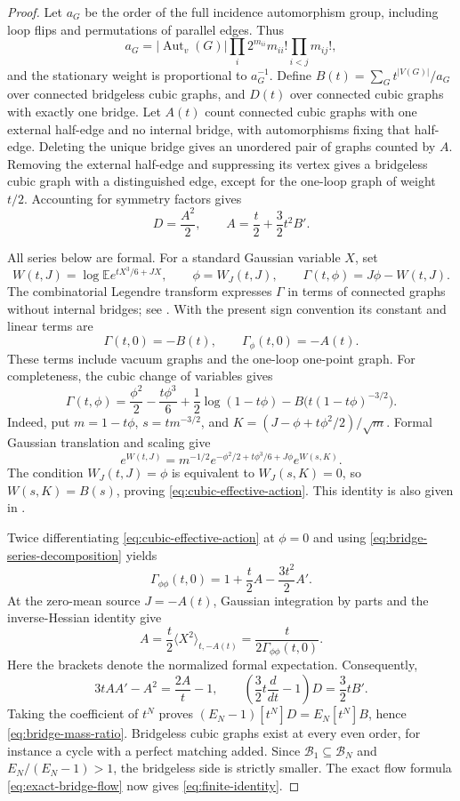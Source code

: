 \documentclass[11pt]{article}
\newcommand{\E}{\mathbb E}
\newcommand{\Aut}{\operatorname{Aut}}
\theoremstyle{plain}
\theoremstyle{definition}
\numberwithin{equation}{section}
\begin{document}
\begin{proof}
Let $a_G$ be the order of the full incidence automorphism group, including
loop flips and permutations of parallel edges.  Thus
\[
 a_G=|\Aut_v(G)|\prod_i2^{m_{ii}}m_{ii}!\prod_{i<j}m_{ij}!,
\]
and the stationary weight is proportional to $a_G^{-1}$.  Define
$B(t)=\sum_Gt^{|V(G)|}/a_G$ over connected bridgeless cubic graphs, and
$D(t)$ over connected cubic graphs with exactly one bridge.  Let $A(t)$
count connected cubic graphs with one external half-edge and no internal
bridge, with automorphisms fixing that half-edge.  Deleting the unique
bridge gives an unordered pair of graphs counted by $A$.  Removing the
external half-edge and suppressing its vertex gives a bridgeless cubic
graph with a distinguished edge, except for the one-loop graph of weight
$t/2$.  Accounting for symmetry factors gives
\begin{equation}\label{eq:bridge-series-decomposition}
 D=\frac{A^2}{2},\qquad A=\frac t2+\frac32t^2B'.
\end{equation}

All series below are formal.  For a standard Gaussian variable $X$, set
\[
 W(t,J)=\log\E e^{tX^3/6+JX},\qquad
 \phi=W_J(t,J),\qquad \Gamma(t,\phi)=J\phi-W(t,J).
\]
The combinatorial Legendre transform expresses $\Gamma$ in terms of
connected graphs without internal bridges; see
\cite[Section~5.8]{Borinsky2018}.  With the present sign convention its
constant and linear terms are
\[
 \Gamma(t,0)=-B(t),\qquad \Gamma_\phi(t,0)=-A(t).
\]
These terms include vacuum graphs and the one-loop one-point graph.
For completeness, the cubic change of variables gives
\begin{equation}\label{eq:cubic-effective-action}
 \Gamma(t,\phi)=\frac{\phi^2}{2}-\frac{t\phi^3}{6}
 +\frac12\log(1-t\phi)
 -B\bigl(t(1-t\phi)^{-3/2}\bigr).
\end{equation}
Indeed, put $m=1-t\phi$, $s=tm^{-3/2}$, and
$K=(J-\phi+t\phi^2/2)/\sqrt m$.  Formal Gaussian translation and scaling
give
\[
 e^{W(t,J)}=m^{-1/2}
 e^{-\phi^2/2+t\phi^3/6+J\phi}e^{W(s,K)}.
\]
The condition $W_J(t,J)=\phi$ is equivalent to $W_J(s,K)=0$, so
$W(s,K)=B(s)$, proving \eqref{eq:cubic-effective-action}.
This identity is also given in \cite[Section~7.5]{Borinsky2018}.

Twice differentiating \eqref{eq:cubic-effective-action} at $\phi=0$ and
using \eqref{eq:bridge-series-decomposition} yields
\[
 \Gamma_{\phi\phi}(t,0)=1+\frac t2A-\frac{3t^2}{2}A'.
\]
At the zero-mean source $J=-A(t)$, Gaussian integration by parts and the
inverse-Hessian identity give
\[
 A=\frac t2\langle X^2\rangle_{t,-A(t)}
   =\frac{t}{2\Gamma_{\phi\phi}(t,0)}.
\]
Here the brackets denote the normalized formal expectation.  Consequently,
\[
 3tAA'-A^2=\frac{2A}{t}-1,
 \qquad
 \left(\frac32t\frac{d}{dt}-1\right)D
 =\frac32tB'.
\]
Taking the coefficient of $t^N$ proves
$(E_N-1)[t^N]D=E_N[t^N]B$, hence \eqref{eq:bridge-mass-ratio}.
Bridgeless cubic graphs exist at every even order, for instance a cycle
with a perfect matching added.  Since $\mathcal B_1\subseteq\mathcal B_N$
and $E_N/(E_N-1)>1$, the bridgeless side is strictly smaller.  The exact flow
formula \eqref{eq:exact-bridge-flow} now gives \eqref{eq:finite-identity}.
\end{proof}
\end{document}
